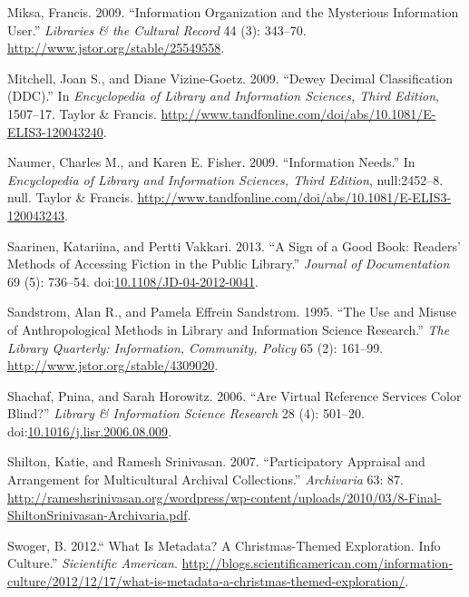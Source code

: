 \documentclass[]{article}
\begin{document}
\hypertarget{ref-miksaux5finformationux5f2009}{}
Miksa, Francis. 2009. ``Information Organization and the Mysterious
Information User.'' \emph{Libraries \& the Cultural Record} 44 (3):
343--70. \url{http://www.jstor.org/stable/25549558}.

\hypertarget{ref-mitchellux5fdeweyux5f2009}{}
Mitchell, Joan S., and Diane Vizine-Goetz. 2009. ``Dewey Decimal
Classification (DDC).'' In \emph{Encyclopedia of Library and Information
Sciences, Third Edition}, 1507--17. Taylor \& Francis.
\url{http://www.tandfonline.com/doi/abs/10.1081/E-ELIS3-120043240}.

\hypertarget{ref-naumerux5finformationux5f2009}{}
Naumer, Charles M., and Karen E. Fisher. 2009. ``Information Needs.'' In
\emph{Encyclopedia of Library and Information Sciences, Third Edition},
null:2452--8. null. Taylor \& Francis.
\url{http://www.tandfonline.com/doi/abs/10.1081/E-ELIS3-120043243}.

\hypertarget{ref-saarinenux5fsignux5f2013}{}
Saarinen, Katariina, and Pertti Vakkari. 2013. ``A Sign of a Good Book:
Readers' Methods of Accessing Fiction in the Public Library.''
\emph{Journal of Documentation} 69 (5): 736--54.
doi:\href{https://doi.org/10.1108/JD-04-2012-0041}{10.1108/JD-04-2012-0041}.

\hypertarget{ref-sandstromux5fuseux5f1995}{}
Sandstrom, Alan R., and Pamela Effrein Sandstrom. 1995. ``The Use and
Misuse of Anthropological Methods in Library and Information Science
Research.'' \emph{The Library Quarterly: Information, Community, Policy}
65 (2): 161--99. \url{http://www.jstor.org/stable/4309020}.

\hypertarget{ref-shachafux5fareux5f2006}{}
Shachaf, Pnina, and Sarah Horowitz. 2006. ``Are Virtual Reference
Services Color Blind?'' \emph{Library \& Information Science Research}
28 (4): 501--20.
doi:\href{https://doi.org/10.1016/j.lisr.2006.08.009}{10.1016/j.lisr.2006.08.009}.

\hypertarget{ref-shiltonux5fparticipatoryux5f2007}{}
Shilton, Katie, and Ramesh Srinivasan. 2007. ``Participatory Appraisal
and Arrangement for Multicultural Archival Collections.''
\emph{Archivaria} 63: 87.
\url{http://rameshsrinivasan.org/wordpress/wp-content/uploads/2010/03/8-Final-ShiltonSrinivasan-Archivaria.pdf}.

\hypertarget{ref-swogerux5f.ux5f2012}{}
Swoger, B. 2012.`` What Is Metadata? A Christmas-Themed Exploration.
Info Culture.'' \emph{Sicientific American}.
\href{http://blogs.scientificamerican.com/information-\%20culture/2012/12/17/what-is-metadata-a-christmas-themed-exploration/}{http://blogs.scientificamerican.com/information- culture/2012/12/17/what-is-metadata-a-christmas-themed-exploration/}.
\end{document}

